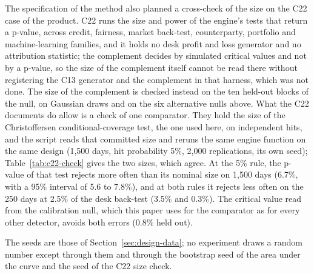The specification of the method also planned a cross-check of the size on the C22 case of the product.
C22 runs the size and power of the engine's tests that return a p-value, across credit, fairness, market back-test, counterparty, portfolio and machine-learning families, and it holds no desk profit and loss generator and no attribution statistic; the complement decides by simulated critical values and not by a p-value, so the size of the complement itself cannot be read there without registering the C13 generator and the complement in that harness, which was not done.
The size of the complement is checked instead on the ten held-out blocks of the null, on Gaussian draws and on the six alternative nulls above.
What the C22 documents do allow is a check of one comparator.
They hold the size of the Christoffersen conditional-coverage test, the one used here, on independent hits, and the script  reads that committed size and reruns the same engine function on the same design (1,500 days, hit probability 5\%, 2,000 replications, its own seed); Table~\ref{tab:c22-check} gives the two sizes, which agree.
At the 5\% rule, the p-value of that test rejects more often than its nominal size on 1,500 days (6.7\%, with a 95\% interval of 5.6 to 7.8\%), and at both rules it rejects less often on the 250 days at 2.5\% of the desk back-test (3.5\% and 0.3\%). The critical value read from the calibration null, which this paper uses for the comparator as for every other detector, avoids both errors (0.8\% held out).


The seeds are those of Section~\ref{sec:design-data}; no experiment draws a random number except through them and through the bootstrap seed of the area under the curve and the seed of the C22 size check.
